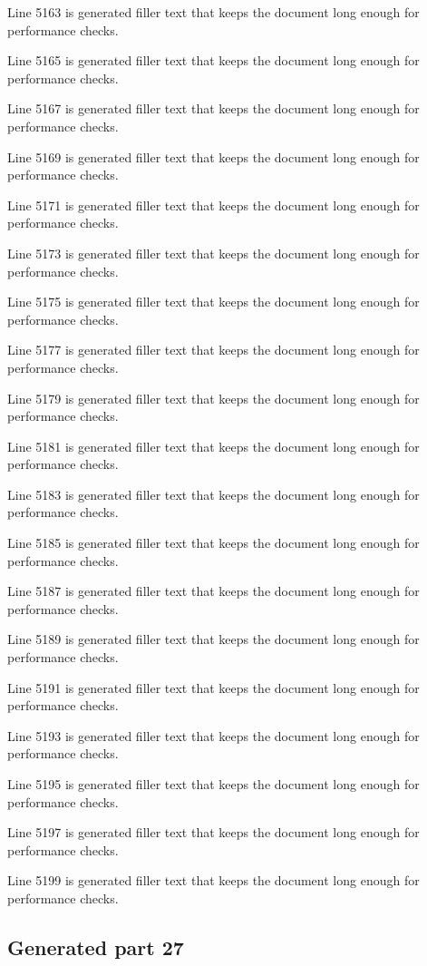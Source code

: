 Line 5163 is generated filler text that keeps the document long enough for performance checks.

Line 5165 is generated filler text that keeps the document long enough for performance checks.

Line 5167 is generated filler text that keeps the document long enough for performance checks.

Line 5169 is generated filler text that keeps the document long enough for performance checks.

Line 5171 is generated filler text that keeps the document long enough for performance checks.

Line 5173 is generated filler text that keeps the document long enough for performance checks.

Line 5175 is generated filler text that keeps the document long enough for performance checks.

Line 5177 is generated filler text that keeps the document long enough for performance checks.

Line 5179 is generated filler text that keeps the document long enough for performance checks.

Line 5181 is generated filler text that keeps the document long enough for performance checks.

Line 5183 is generated filler text that keeps the document long enough for performance checks.

Line 5185 is generated filler text that keeps the document long enough for performance checks.

Line 5187 is generated filler text that keeps the document long enough for performance checks.

Line 5189 is generated filler text that keeps the document long enough for performance checks.

Line 5191 is generated filler text that keeps the document long enough for performance checks.

Line 5193 is generated filler text that keeps the document long enough for performance checks.

Line 5195 is generated filler text that keeps the document long enough for performance checks.

Line 5197 is generated filler text that keeps the document long enough for performance checks.

Line 5199 is generated filler text that keeps the document long enough for performance checks.

\subsection{Generated part 27}

